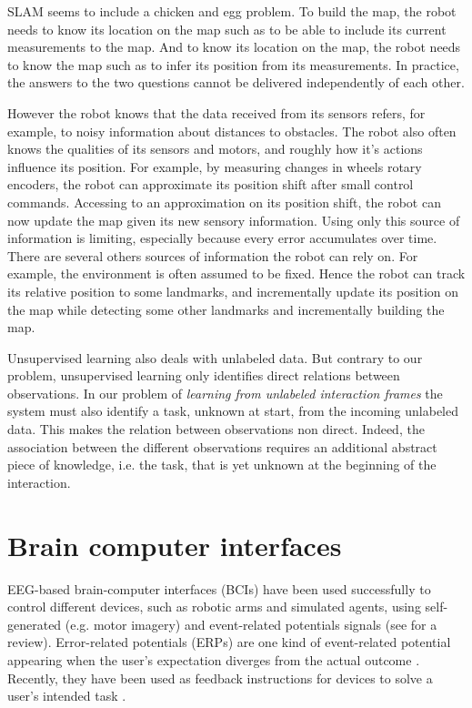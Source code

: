 SLAM seems to include a chicken and egg problem. To build the map, the robot needs to know its location on the map such as to be able to include its current measurements to the map. And to know its location on the map, the robot needs to know the map such as to infer its position from its measurements. In practice, the answers to the two questions cannot be delivered independently of each other.

However the robot knows that the data received from its sensors refers, for example, to noisy information about distances to obstacles. The robot also often knows the qualities of its sensors and motors, and roughly how it's actions influence its position. For example, by measuring changes in wheels rotary encoders, the robot can approximate its position shift after small control commands. Accessing to an approximation on its position shift, the robot can now update the map given its new sensory information. Using only this source of information is limiting, especially because every error accumulates over time. There are several others sources of information the robot can rely on. For example, the environment is often assumed to be fixed. Hence the robot can track its relative position to some landmarks, and incrementally update its position on the map while detecting some other landmarks and incrementally building the map.

\transition

Unsupervised learning also deals with unlabeled data. But contrary to our problem, unsupervised learning only identifies direct relations between observations. In our problem of \emph{learning from unlabeled interaction frames} the system must also identify a task, unknown at start, from the incoming unlabeled data. This makes the relation between observations non direct. Indeed, the association between the different observations requires an additional abstract piece of knowledge, i.e. the task, that is yet unknown at the beginning of the interaction.

\section{Brain computer interfaces}

EEG-based brain-computer interfaces (BCIs) have been used successfully to control different devices, such as robotic arms and simulated agents, using self-generated (e.g. motor imagery) and event-related potentials signals (see \cite{millan10} for a review). Error-related potentials (ERPs) are one kind of event-related potential appearing when the user's expectation diverges from the actual outcome \cite{Falkenstein00,chavarriaga2014errare}. Recently, they have been used as feedback instructions for devices to solve a user's intended task \cite{chavarriaga2010learning,iturrate13}.

